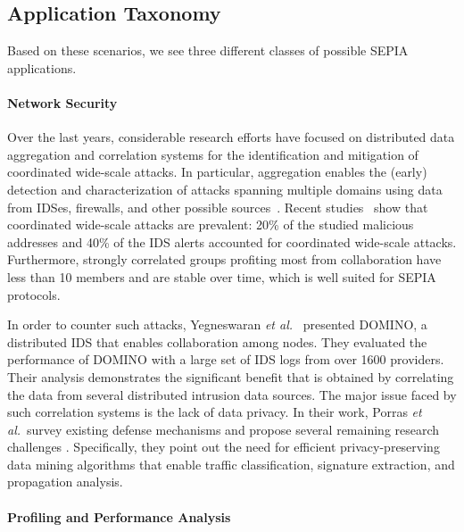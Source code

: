 \documentclass[letterpaper,11pt,onecolumn,titlepage]{article}
\begin{document}
\subsection{Application Taxonomy}
Based on these scenarios, we see three different classes of possible SEPIA applications.

\paragraph{Network Security}

Over the last years, considerable research efforts have focused on
distributed data aggregation and correlation systems for the
identification and mitigation of coordinated wide-scale attacks. In
particular, aggregation enables the (early) detection and
characterization of attacks spanning multiple domains using data from
IDSes, firewalls, and other possible
sources~\cite{ATLAS,DShield,lincoln2004alerts,yegneswaran2004gid}.
Recent studies~\cite{katti2005cac} show that coordinated wide-scale
attacks are prevalent: 20\% of the studied malicious addresses and
40\% of the IDS alerts accounted for coordinated wide-scale attacks.
Furthermore, strongly correlated groups profiting most from
collaboration have less than 10 members and are stable over time,
which is well suited for SEPIA protocols.

In order to counter such attacks, Yegneswaran \emph{et
al.}~\cite{yegneswaran2004gid} presented DOMINO, a distributed IDS
that enables collaboration among nodes. They evaluated the performance
of DOMINO with a large set of IDS logs from over 1600 providers.
Their analysis demonstrates the significant benefit that is obtained
by correlating the data from several distributed intrusion data
sources. The major issue faced by such correlation systems is the lack
of data privacy. In their work, Porras \emph{et al.}~survey existing
defense mechanisms and propose several remaining research challenges
\cite{porras2006lcs}.  Specifically, they point out the need for
efficient privacy-preserving data mining algorithms that enable
traffic classification, signature extraction, and propagation
analysis.

\paragraph{Profiling and Performance Analysis}
\end{document}
